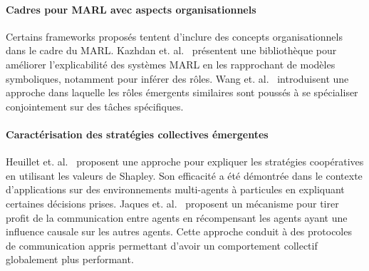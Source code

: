 \documentclass[demonstration]{jfsma}
\newcommand{\jp}[1]{\textbf{\color{red} JPJ: #1}}
\begin{document}
\paragraph{\textbf{Cadres pour MARL avec aspects organisationnels}}
%
Certains frameworks proposés tentent d'inclure des concepts organisationnels dans le cadre du MARL.
Kazhdan et. al.~\cite{Kazhdan2020} présentent une bibliothèque pour améliorer l'explicabilité des systèmes MARL en les rapprochant de modèles symboliques, notamment pour inférer des rôles.%
%
Wang et. al.~\cite{Wang2020} introduisent une approche dans laquelle les rôles émergents similaires sont poussés à se spécialiser conjointement sur des tâches spécifiques.
%
%

\paragraph{\textbf{Caractérisation des stratégies collectives émergentes}}
%
Heuillet et. al.~\cite{Heuillet2022} proposent une approche pour expliquer les stratégies coopératives en utilisant les valeurs de Shapley. Son efficacité a été démontrée dans le contexte d'applications sur des environnements multi-agents à particules en  expliquant certaines décisions prises. 
%
Jaques et. al.~\cite{Jaques2019} proposent un mécanisme pour tirer profit de la communication entre agents en récompensant les agents ayant une influence causale sur les autres agents. Cette approche conduit à des protocoles de communication appris permettant d'avoir un comportement collectif globalement plus performant.
\end{document}
